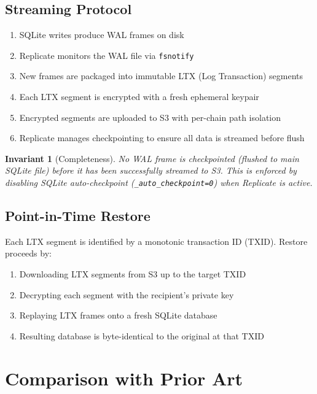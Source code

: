 \documentclass[11pt,a4paper]{article}
\newtheorem{invariant}{Invariant}[section]
\begin{document}
\subsection{Streaming Protocol}

\begin{enumerate}
  \item SQLite writes produce WAL frames on disk
  \item Replicate monitors the WAL file via \texttt{fsnotify}
  \item New frames are packaged into immutable LTX (Log Transaction) segments
  \item Each LTX segment is encrypted with a fresh ephemeral keypair
  \item Encrypted segments are uploaded to S3 with per-chain path isolation
  \item Replicate manages checkpointing to ensure all data is streamed before flush
\end{enumerate}

\begin{invariant}[Completeness]
No WAL frame is checkpointed (flushed to main SQLite file) before it has been successfully
streamed to S3. This is enforced by disabling SQLite auto-checkpoint
(\texttt{\_auto\_checkpoint=0}) when Replicate is active.
\end{invariant}

\subsection{Point-in-Time Restore}

Each LTX segment is identified by a monotonic transaction ID (TXID). Restore proceeds by:

\begin{enumerate}
  \item Downloading LTX segments from S3 up to the target TXID
  \item Decrypting each segment with the recipient's private key
  \item Replaying LTX frames onto a fresh SQLite database
  \item Resulting database is byte-identical to the original at that TXID
\end{enumerate}

\section{Comparison with Prior Art}
\end{document}
